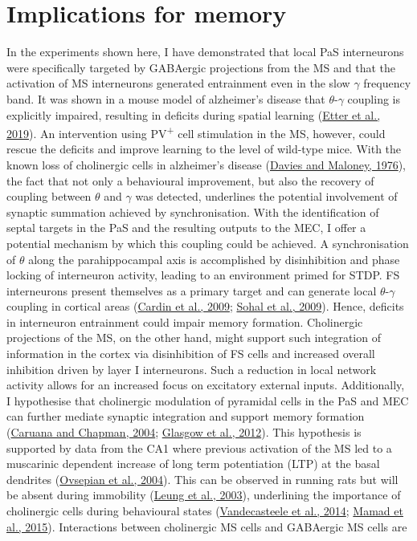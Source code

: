 \documentclass[
  12pt,
  a4paper,
  openany]{book}
\begin{document}
\hypertarget{implications-for-memory}{%
\section{Implications for memory}\label{implications-for-memory}}

In the experiments shown here, I have demonstrated that local PaS interneurons were specifically targeted by GABAergic projections from the MS and that the activation of MS interneurons generated entrainment even in the slow \(\gamma\) frequency band. It was shown in a mouse model of alzheimer's disease that \(\theta\)-\(\gamma\) coupling is explicitly impaired, resulting in deficits during spatial learning (\protect\hyperlink{ref-etter_optogenetic_2019}{Etter et al., 2019}). An intervention using PV\textsuperscript{+} cell stimulation in the MS, however, could rescue the deficits and improve learning to the level of wild-type mice. With the known loss of cholinergic cells in alzheimer's disease (\protect\hyperlink{ref-davies_selective_1976}{Davies and Maloney, 1976}), the fact that not only a behavioural improvement, but also the recovery of coupling between \(\theta\) and \(\gamma\) was detected, underlines the potential involvement of synaptic summation achieved by synchronisation. With the identification of septal targets in the PaS and the resulting outputs to the MEC, I offer a potential mechanism by which this coupling could be achieved. A synchronisation of \(\theta\) along the parahippocampal axis is accomplished by disinhibition and phase locking of interneuron activity, leading to an environment primed for STDP. FS interneurons present themselves as a primary target and can generate local \(\theta\)-\(\gamma\) coupling in cortical areas (\protect\hyperlink{ref-cardin_driving_2009}{Cardin et al., 2009}; \protect\hyperlink{ref-sohal_parvalbumin_2009}{Sohal et al., 2009}). Hence, deficits in interneuron entrainment could impair memory formation. Cholinergic projections of the MS, on the other hand, might support such integration of information in the cortex via disinhibition of FS cells and increased overall inhibition driven by layer I interneurons. Such a reduction in local network activity allows for an increased focus on excitatory external inputs. Additionally, I hypothesise that cholinergic modulation of pyramidal cells in the PaS and MEC can further mediate synaptic integration and support memory formation (\protect\hyperlink{ref-caruana_stimulation_2004}{Caruana and Chapman, 2004}; \protect\hyperlink{ref-glasgow_cholinergic_2012}{Glasgow et al., 2012}). This hypothesis is supported by data from the CA1 where previous activation of the MS led to a muscarinic dependent increase of long term potentiation (LTP) at the basal dendrites (\protect\hyperlink{ref-ovsepian_endogenous_2004}{Ovsepian et al., 2004}). This can be observed in running rats but will be absent during immobility (\protect\hyperlink{ref-leung_cholinergic_2003}{Leung et al., 2003}), underlining the importance of cholinergic cells during behavioural states (\protect\hyperlink{ref-vandecasteele_optogenetic_2014}{Vandecasteele et al., 2014}; \protect\hyperlink{ref-mamad_medial_2015}{Mamad et al., 2015}). Interactions between cholinergic MS cells and GABAergic MS cells are 
\end{document}
